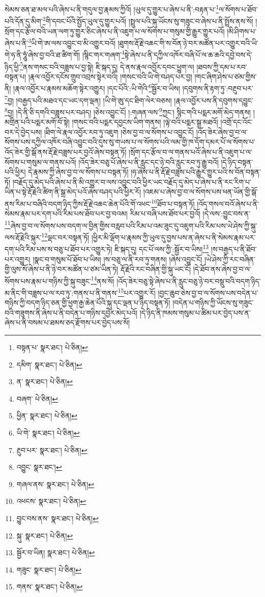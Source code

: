 སེམས་ཅན་ཐ་མལ་པའི་ཞེས་པ་ནི་གདུལ་བྱ་རྣམས་ཀྱིའོ། །ཡུལ་དུ་གྱུར་པ་ཞེས་པ་ནི་:བརྟན་པ་\footnote{བསྟན་པ་  སྣར་ཐང་།  པེ་ཅིན། }ལ་སོགས་པ་ཐོབ་པའི་དོན་དུ་མིག་\footnote{དམིག་  སྣར་ཐང་།  པེ་ཅིན། }གི་དབང་པོའི་སྤྱོད་ཡུལ་དུ་གྱུར་པའོ། །སྤྲུལ་པའི་སྐུ་ཡོངས་སུ་གཟུང་བ་ཞེས་པ་ནི་སྤྲོས་ནས་སོ། །སྲོག་དང་རྩོལ་བའི་ཡན་ལག་ཏུ་གྱུར་ཅིང་ཞེས་པ་ནི་འཇུག་པ་ལ་སོགས་པ་གསུམ་གྱི་རྒྱུར་གྱུར་པའོ། །མི་ཤིགས་པ་ཞེས་པ་ནི་\footnote{ན་  སྣར་ཐང་།  པེ་ཅིན། }ཡི་གེ་ཨ་ལས་འབྱུང་བ་མི་འགྱུར་བའོ། །ཐུགས་རྡོ་རྗེ་འཆང་གི་ས་བོན་ཉེ་བར་མཚོན་པར་འགྱུར་བའི་ཡི་གེ་ཧ་ནི་ཧཱུཾ་ཞེས་བྱ་བའི་ཐ་ཚིག་གོ། །སྙིང་གར་གཞག་\footnote{བཞག་  པེ་ཅིན། }སྟེ་ཞེས་པ་ནི་དཀྱིལ་འཁོར་བཞི་པོ་ལ་ཆ་ཆའི་དབྱེ་བས་དེ་ཉིད་ཕྱི་\footnote{ཕྱིན་  སྣར་ཐང་།  པེ་ཅིན། }ནས་གསང་བའི་བཟླས་པ་བྱ་སྟེ། ཇི་སྐད་དུ། དེ་ནས་རྣལ་འབྱོར་དབང་ཕྱུག་ལ། །ཐབས་ཀྱི་དམ་པ་རབ་བསྟན་པ། །རྣལ་འབྱོར་དངོས་གྲུབ་འབྲས་སྟེར་བའི། །གསང་བའི་ཡི་གེ་བཤད་པར་བྱ། །གང་ཞིག་ཤེས་པ་ཙམ་གྱིས་ནི། །རྣལ་འབྱོར་པ་རྣམས་མཆོག་སྟེར་འགྱུར། །དང་པོའི་:ཡི་གེའི་\footnote{ཡི་གེ་  སྣར་ཐང་།  པེ་ཅིན། }སྦྱོར་བ་ཡིས། །དབུགས་ནི་རྟག་ཏུ་:བརྔུབ་པར་\footnote{རྔུབ་པར་  སྣར་ཐང་།  པེ་ཅིན། }བྱ། །བརྒྱད་པའི་མཐའ་དང་ཡང་དག་ལྡན། །ཡི་གེ་ཨུ་དང་ཐིག་ལེར་བཅས། །རྣལ་འབྱོར་པས་ནི་དབུགས་དབྱུང་\footnote{འབྱུང་  སྣར་ཐང་། }བྱ། །དེ་ནི་ཅི་དགའི་བཟླས་པར་བཤད། །ཅེས་འབྱུང་ངོ། །:གཞན་ལས་\footnote{གཞལ་ནས་  སྣར་ཐང་།  པེ་ཅིན། }ཀྱང་། སྙིང་གའི་པདྨར་མགོ་མེད་གནས། །མགྲིན་པའི་པདྨར་མགོ་བོ་སྟེ། །གསང་བའི་པདྨར་དབྱངས་ཡིག་གནས། །ལྟེ་བའི་པདྨར་སྒྲ་མཐའོ། །འགྲོ་དང་འོང་བར་དེ་བྱེད་པས། །ཐིག་ལེ་རྣལ་འབྱོར་རབ་ཏུ་འཇུག །ཅེས་བྱ་བ་ལ་སོགས་པ་འབྱུང་ངོ། །འོད་ཟེར་ཞེས་བྱ་བ་ལ་སོགས་པས་དཀྱིལ་འཁོར་བཞི་འབྱུང་བའི་དུས་སུ་གཡས་པ་ལ་སོགས་པའི་ལམ་གྱི་ཁ་དོག་དམར་པོ་ལ་སོགས་པ་འོད་ཟེར་གྱི་སྒོ་ནས་རྡོ་རྗེ་བཟླས་པར་བྱའོ་ཞེས་བསྟན་ཏོ། །སྲོག་དང་རྩོལ་བ་ལ་གནས་པའོ་ཞེས་པ་ནི་འཇུག་པ་ལ་སོགས་པ་གསུམ་ལ་གནས་པའོ། །འོད་ཟེར་བཅུ་པོ་ཞེས་པ་ནི་རླུང་དང་ཉེ་བའི་རླུང་རབ་ཏུ་རྒྱུ་བའོ། །དེ་ཉིད་བསྟན་པའི་ཕྱིར། དེ་རྣམས་ཀྱི་ཞེས་བྱ་བ་ལ་སོགས་པ་བསྟན་ཏོ། །ཧ་ཞེས་པ་ནི་རྡོ་རྗེ་བཟླས་པའི་རྒྱུར་གྱུར་པའི་ས་བོན་བསྟན་ཏོ། །བརྗོད་དུ་མེད་པའི་ཞེས་པ་ནི་མི་འགྱུར་བ་ལས་འབྱུང་བའི་ཕྱིར་ཡང་བརྗོད་དུ་མེད་པ་ཞེས་པ་ནི་རང་རིག་པ་ཡིན་པ་སྟེ་རྡོ་རྗེའི་ཚིག་ནི་སྒྲ་མེད་པའོ་ཞེས་བཤད་པའི་ཕྱིར་རོ། །འཇམ་པ་ཞེས་བྱ་བ་ལ་སོགས་པས་ཕན་ཡོན་གྱི་སྒོ་ནས་རིམ་པ་བཞིའི་བདག་ཉིད་ཀྱིས་རྡོ་རྗེ་འཆང་ཆེན་པོའི་གོ་འཕང་\footnote{འཕངས་  སྣར་ཐང་།  པེ་ཅིན། }ཐོབ་པ་བསྟན་ཏོ། །འོད་གསལ་བའོ་ཞེས་པ་ནི་སེམས་རྣམ་པར་དག་པའི་རིམ་པས་ཐོབ་པར་བྱ་བའམ། རིམ་པ་བཞི་པས་ཐོབ་པར་བྱའོ། །དེ་ལས་:བྱུང་བས་ན་\footnote{བྱུང་བས་ནས་  སྣར་ཐང་།  པེ་ཅིན། }ཞེས་བྱ་བ་ལ་སོགས་པས་བདག་ལ་བྱིན་གྱིས་བརླབ་པའི་རིམ་པ་འམ་ཟུང་དུ་འཇུག་པའི་རིམ་པས་ཡེ་ཤེས་ཀྱི་སྐུ་ལས་རྡོ་རྗེའི་སྐུར་\footnote{སྐུ་  སྣར་ཐང་།  པེ་ཅིན། }ལྡང་བར་བསྟན་ཏོ། །ཕྱིར་མི་ལྡོག་པ་རྣམས་ཀྱི་ཡུལ་དུ་བྱས་པས་ན་ཞེས་པ་ནི་སེམས་རྣམ་པར་དག་པའི་རིམ་པས་ས་བཅུ་པ་ཐོབ་པར་འགྱུར་ཏེ། ཇི་སྐད་དུ། དང་པོ་ལས་ཀྱི་:སྦྱོར་བ་ཡིས།\footnote{སྦྱོར་བ་ཡིན།  སྣར་ཐང་།  པེ་ཅིན། } །ས་བརྒྱད་པ་ནི་ཐོབ་པར་འགྱུར། །སྣང་བ་གསུམ་པོ་ཐོབ་པ་ཡིས། །ས་བཅུ་ལ་ནི་རབ་ཏུ་གནས། །ཞེས་འབྱུང་ངོ། །ཡེ་ཤེས་ཀྱི་རང་བཞིན་གྱི་ལུས་སོ་ཞེས་པ་ནི་ཉེ་བར་མཚོན་པ་ཙམ་ཡིན་ཏེ། རྡོ་རྗེའི་རང་བཞིན་གྱི་སྐུ་ཡང་ངོ། །དེ་ཐོབ་ནས་ཞེས་བྱ་བ་ལ་སོགས་པས་རྣམ་པ་གཉིས་ཀྱི་སྐུ་བཟུང་\footnote{གཟུང་  སྣར་ཐང་།  པེ་ཅིན། }ནས་སོ། །འོད་ཟེར་བཅུ་སྟེ་ཞེས་པ་ནི་རླུང་བཅུ་ཉེ་བར་བསྡུ་བའི་བདག་ཉིད་མ་ནིང་གི་བཟླས་པ་ལ་རབ་ཏུ་:གནས་པ་ནི་གནས་\footnote{གནས་  སྣར་ཐང་།  པེ་ཅིན། }པར་འགྱུར་རོ། །བྱང་ཆུབ་ཅེས་བྱ་བ་ལ་སོགས་པས་བདེན་པ་གཉིས་ཀྱི་བདག་ཉིད་ཅན་གྱི་ཕྱག་རྒྱ་ཆེན་པོའི་སྐུ་དང་ལྡན་པ་ཉིད་བསྟན་ཏོ། །བདེན་པ་གཉིས་ཀྱི་ཡོངས་སུ་གཟུང་བའི་གཟུགས་ནི་ཞེས་པ་ནི་བདེན་པ་གཉིས་དབྱེར་མེད་པའོ། །དེ་ཉིད་ནི་ཁམས་གསུམ་པ་ཚིམ་པར་བྱེད་པས་ན་ཞེས་པ་ནི་བསམ་པ་ཐམས་ཅད་རྫོགས་པར་བྱེད་པས་སོ། 